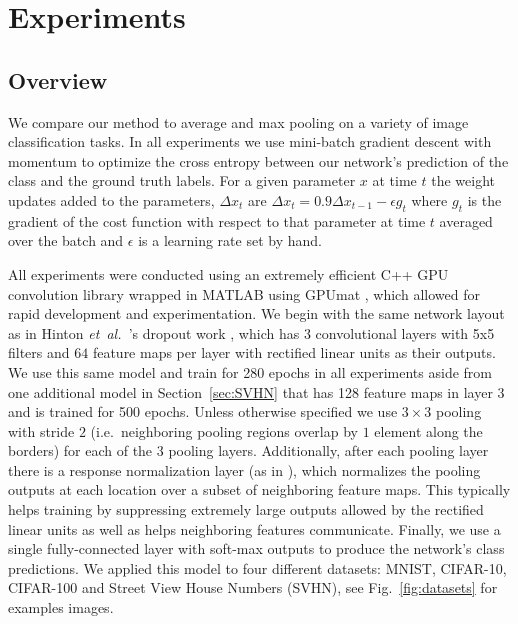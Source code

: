 \documentclass{article} %
\newcommand{\fig}[1]{Fig.~\ref{fig:#1}}
\newcommand{\secc}[1]{Section~\ref{sec:#1}}
\def\etal{{\textit{et~al.~}}}
\begin{document}
\section{Experiments}
\label{exp_sec}

\subsection{Overview}
We compare our method to average and max pooling on a
variety of image classification tasks. In all experiments we use
mini-batch gradient descent with momentum to optimize the cross
entropy between our network's prediction of the class and the ground
truth labels. For a given parameter $x$ at time $t$ the weight updates
added to the parameters, $\Delta x_t$ are $\Delta x_t = 0.9 \Delta
x_{t-1} - \epsilon g_t$ where $g_t$ is the gradient of the cost
function with respect to that parameter at time $t$ averaged over the
batch and $\epsilon$ is a learning rate set by hand.

All experiments were conducted using an extremely efficient C++ GPU
convolution library \cite{cudaconvnet} wrapped in MATLAB using GPUmat
\cite{gpumat}, which allowed for rapid development and
experimentation. We begin with the same network layout as in Hinton
\etal's dropout work \cite{Hinton12}, which has $3$ convolutional layers
with 5x5 filters and $64$ feature maps per layer with rectified linear units as their
outputs. We use this same model and train for 280 epochs in all experiments aside
from one additional model in \secc{SVHN} that has 128 feature maps in layer 3 and is trained for 500
epochs. Unless otherwise specified we use $3 \times 3$
pooling with stride $2$
(i.e.~neighboring pooling regions overlap by $1$ element along the
borders) for each of the $3$ pooling layers. Additionally, after each pooling layer there is a
response normalization layer (as in \cite{Hinton12}), which normalizes the
pooling outputs at each location over a subset of neighboring feature
maps. This typically helps training by suppressing extremely large
outputs allowed by the rectified linear units as well as helps
neighboring features communicate. Finally, we use a single
fully-connected layer with soft-max outputs to produce the network's
class predictions. We applied this model to four different datasets:
MNIST, CIFAR-10, CIFAR-100 and Street View House Numbers (SVHN), see
\fig{datasets} for examples images.
\end{document}
